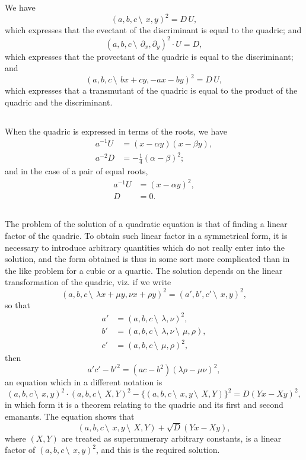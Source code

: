 \documentclass[12pt,a4paper]{article}
\begin{document}
\subsection{}

We have
\[
(a, b, c\,\setminus\!\!\:\, x, y)^2 = D\,U,
\]
which expresses that the evectant of the discriminant is equal to the quadric; and
\[
(a, b, c\,\setminus\!\!\:\, \partial_x, \partial_y)^2 \cdot U = D,
\]
which expresses that the provectant of the quadric is equal to the discriminant; and
\[
(a, b, c\,\setminus\!\!\:\, bx + cy, -ax - by)^2 = D\,U,
\]
which expresses that a transmutant of the quadric is equal to the product of the quadric and the discriminant.

\subsection{}

When the quadric is expressed in terms of the roots, we have
\begin{align*}
a^{-1}U &= (x - \alpha y)(x - \beta y),\\
a^{-2}D &= -\tfrac{1}{4}(\alpha - \beta)^2;
\end{align*}
and in the case of a pair of equal roots,
\begin{align*}
a^{-1}U &= (x - \alpha y)^2,\\
D &= 0.
\end{align*}

\subsection{}

The problem of the solution of a quadratic equation is that of finding a linear factor of the quadric. To obtain such linear factor in a symmetrical form, it is necessary to introduce arbitrary quantities which do not really enter into the solution, and the form obtained is thus in some sort more complicated than in the like problem for a cubic or a quartic. The solution depends on the linear transformation of the quadric, viz. if we write
\[
(a, b, c\,\setminus\!\!\:\, \lambda x + \mu y, \nu x + \rho y)^2 = (a', b', c'\,\setminus\!\!\:\, x, y)^2,
\]
so that
\begin{align*}
a' &= (a, b, c\,\setminus\!\!\:\, \lambda, \nu)^2,\\
b' &= (a, b, c\,\setminus\!\!\:\, \lambda, \nu\,\setminus\!\!\:\, \mu, \rho),\\
c' &= (a, b, c\,\setminus\!\!\:\, \mu, \rho)^2,
\end{align*}
then
\[
a'c' - b'^2 = (ac - b^2)(\lambda\rho - \mu\nu)^2,
\]
an equation which in a different notation is
\[
(a, b, c\,\setminus\!\!\:\, x, y)^2 \cdot (a, b, c\,\setminus\!\!\:\, X, Y)^2 - \{(a, b, c\,\setminus\!\!\:\, x, y\,\setminus\!\!\:\, X, Y)\}^2 = D(Yx - Xy)^2,
\]
in which form it is a theorem relating to the quadric and its first and second emanants. The equation shows that
\[
(a, b, c\,\setminus\!\!\:\, x, y\,\setminus\!\!\:\, X, Y) + \sqrt{D}(Yx - Xy),
\]
where $(X, Y)$ are treated as supernumerary arbitrary constants, is a linear factor of $(a, b, c\,\setminus\!\!\:\, x, y)^2$, and this is the required solution.
\end{document}
